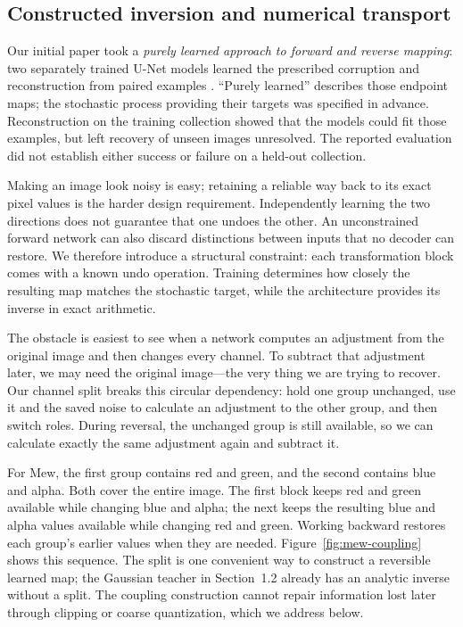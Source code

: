 \documentclass[10pt]{article}
\begin{document}
\FloatBarrier
\subsection{Constructed inversion and numerical transport}
Our initial paper took a \emph{purely learned approach to forward and reverse
mapping}: two separately trained U-Net models learned the prescribed corruption
and reconstruction from paired examples \cite{original}. ``Purely learned''
describes those endpoint maps; the stochastic process providing their targets
was specified in advance. Reconstruction on the training collection showed
that the models could fit those examples, but left recovery of unseen images
unresolved. The reported evaluation did not establish either success or failure
on a held-out collection.

Making an image look noisy is easy; retaining a reliable way back to its exact
pixel values is the harder design requirement. Independently learning the two
directions does not guarantee that one undoes the other. An unconstrained forward
network can also discard distinctions between inputs that no decoder can restore.
We therefore introduce a structural constraint: each transformation block comes
with a known undo operation. Training determines how closely the resulting map
matches the stochastic target, while the architecture provides its inverse in
exact arithmetic.

The obstacle is easiest to see when a network computes an adjustment from the
original image and then changes every channel. To subtract that adjustment
later, we may need the original image---the very thing we are trying to recover.
Our channel split breaks this circular dependency: hold one group unchanged,
use it and the saved noise to calculate an adjustment to the other group, and
then switch roles. During reversal, the unchanged group is still available, so
we can calculate exactly the same adjustment again and subtract it.

For Mew, the first group contains red and green, and the second contains blue
and alpha. Both cover the entire image. The first block keeps red and green
available while changing blue and alpha; the next keeps the resulting blue and
alpha values available while changing red and green. Working backward restores
each group's earlier values when they are needed. Figure~\ref{fig:mew-coupling}
shows this sequence. The split is one convenient way to construct a reversible
learned map; the Gaussian teacher in Section~1.2 already has an analytic inverse
without a split. The coupling construction cannot repair information lost later
through clipping or coarse quantization, which we address below.
\end{document}
